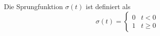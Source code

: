 Die Sprungfunktion $\sigma(t)$ ist definiert als
$$\sigma(t) = \begin{cases} 0 & t < 0 \\
  1 & t \geq 0
\end{cases}$$
